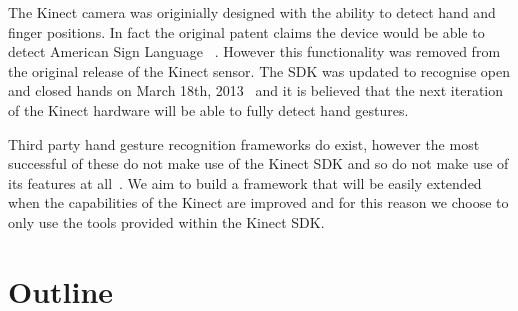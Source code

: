 The Kinect camera was originially designed with the ability to detect hand and finger positions. In fact the original patent claims the device would be able to detect American Sign Language ~\cite{LATTA:2010:biblatex}. However this functionality was removed from the original release of the Kinect sensor. The SDK was updated to recognise open and closed hands on March 18th, 2013~\cite{Microsoft:2013:Online} and it is believed that the next iteration of the Kinect hardware will be able to fully detect hand gestures.

Third party hand gesture recognition frameworks do exist, however the most successful of these do not make use of the Kinect SDK and so do not make use of its features at all~\cite{Forth:2013:Online}. We aim to build a framework that will be easily extended when the capabilities of the Kinect are improved and for this reason we choose to only use the tools provided within the Kinect SDK.
\section{Outline}



